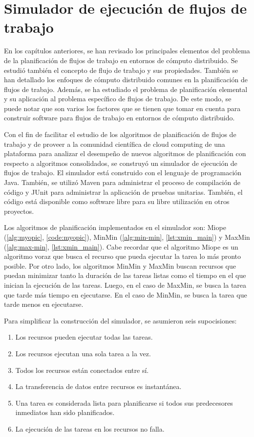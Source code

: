 \chapter[Simulador]{Simulador de ejecución de flujos de trabajo}

En los capítulos anteriores, se han revisado los principales elementos del problema de la planificación de flujos de trabajo en entornos de cómputo distribuido. Se estudió también el concepto de flujo de trabajo y sus propiedades. También se han detallado los enfoques de cómputo distribuido comunes en la planificación de flujos de trabajo. Además, se ha estudiado el problema de planificación elemental y su aplicación al problema específico de flujos de trabajo. De este modo, se puede notar que son varios los factores que se tienen que tomar en cuenta para construir software para flujos de trabajo en entornos de cómputo distribuido.

Con el fin de facilitar el estudio de los algoritmos de planificación de flujos de trabajo y de proveer a la comunidad científica de cloud computing de una plataforma para analizar el desempeño de nuevos algoritmos de planificación con respecto a algoritmos consolidados, se construyó un simulador de ejecución de flujos de trabajo. El simulador está construido con el lenguaje de programación Java. También, se utilizó Maven \cite{maven2014} para administrar el proceso de compilación de código y JUnit \cite{junit2014} para administrar la aplicación de pruebas unitarias. También, el código está disponible como software libre \cite{dominofire2014workflowsimulator} para su libre utilización en otros proyectos.

Los algoritmos de planificación implementados en el simulador son: Miope (\ref{alg:myopic}, \ref{code:myopic}), MinMin (\ref{alg:min-min}, \ref{lst:xmin_main}) y MaxMin (\ref{alg:max-min}, \ref{lst:xmin_main}). Cabe recordar que el algoritmo Miope es un algoritmo voraz que busca el recurso que pueda ejecutar la tarea lo más pronto posible. Por otro lado, los algoritmos MinMin y MaxMin buscan recursos que puedan minimizar tanto la duración de las tareas listas como el tiempo en el que inician la ejecución de las tareas. Luego, en el caso de MaxMin, se busca la tarea que tarde más tiempo en ejecutarse. En el caso de MinMin, se busca la tarea que tarde menos en ejecutarse.

Para simplificar la construcción del simulador, se asumieron seis supocisiones:

\begin{enumerate}
\item Los recursos pueden ejecutar todas las tareas.
\item Los recursos ejecutan una sola tarea a la vez.
\item Todos los recursos están conectados entre sí.
\item La transferencia de datos entre recursos es instantánea.
\item Una tarea es considerada lista para planificarse si todos sus predecesores inmediatos han sido planificados.
\item La ejecución de las tareas en los recursos no falla.
\end{enumerate}

